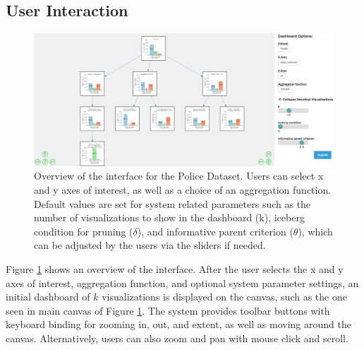 \subsection{User Interaction\label{sec:interaction}}
\begin{figure}[ht!]
\centering
\includegraphics[width=\linewidth]{figures/overview.jpeg}
\caption{Overview of the \system interface for the Police Dataset. Users can select x and y axes of interest, as well as a choice of an aggregation function. Default values are set for system related parameters such as the number of visualizations to show in the dashboard (k), iceberg condition for pruning ($\delta$), and informative parent criterion ($\theta$), which can be adjusted by the users via the sliders if needed.}
\label{fig:overview}
\end{figure}
\par Figure \ref{fig:overview} shows an overview of the \system interface. After the user selects the x and y axes of interest, aggregation function, and optional system parameter settings, an initial dashboard of $k$ visualizations is displayed on the canvas, such as the one seen in main canvas of Figure \ref{fig:overview}. The system provides toolbar buttons with keyboard binding for zooming in, out, and extent, as well as moving around the canvas. Alternatively, users can also zoom and pan with mouse click and scroll.
